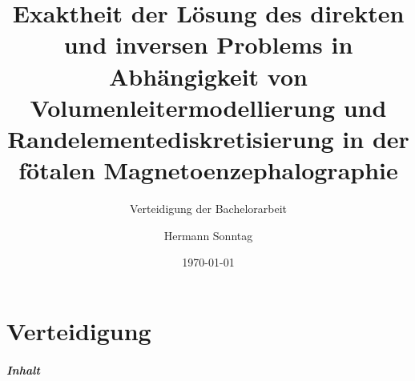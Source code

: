 \title{Exaktheit der Lösung des direkten und inversen Problems in Abhängigkeit von Volumenleitermodellierung und Randelementediskretisierung in der fötalen Magnetoenzephalographie}
\subtitle{Verteidigung der Bachelorarbeit}
\author{Hermann Sonntag}
\titlegraphic{}
\date{\today}
\begin{frame}[plain]
  \titlepage
\end{frame}
\part{Verteidigung}
\frame{\partpage}
\begin{frame}
	\frametitle{Inhalt}
	\tableofcontents[%
		pausesections, %
	]
\end{frame}
